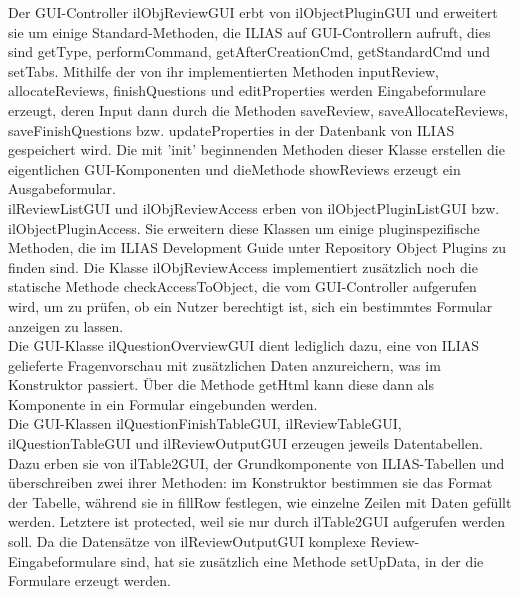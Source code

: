 \documentclass[a4paper]{scrreprt}
\begin{document}
Der GUI-Controller ilObjReviewGUI erbt von ilObjectPluginGUI und erweitert sie um einige Standard-Methoden, die ILIAS auf GUI-Controllern aufruft, dies sind getType, performCommand, getAfterCreationCmd, getStandardCmd und setTabs. Mithilfe der von ihr implementierten Methoden inputReview, allocateReviews, finishQuestions und editProperties werden Eingabeformulare erzeugt, deren Input dann durch die Methoden saveReview, saveAllocateReviews, saveFinishQuestions bzw. updateProperties in der Datenbank von ILIAS gespeichert wird. Die mit 'init' beginnenden Methoden dieser Klasse erstellen die eigentlichen GUI-Komponenten und dieMethode showReviews erzeugt ein Ausgabeformular.\\
ilReviewListGUI und ilObjReviewAccess erben von ilObjectPluginListGUI bzw. ilObjectPluginAccess. Sie erweitern diese Klassen um einige pluginspezifische Methoden, die im ILIAS Development Guide unter Repository Object Plugins
zu finden sind. Die Klasse ilObjReviewAccess implementiert zusätzlich noch die statische Methode checkAccessToObject, die vom GUI-Controller aufgerufen wird, um zu prüfen, ob ein Nutzer berechtigt ist, sich ein bestimmtes Formular anzeigen zu lassen.\\
Die GUI-Klasse ilQuestionOverviewGUI dient lediglich dazu, eine von ILIAS gelieferte Fragenvorschau mit zusätzlichen Daten anzureichern, was im Konstruktor passiert. Über die Methode getHtml kann diese dann als Komponente in ein Formular eingebunden werden.\\
Die GUI-Klassen ilQuestionFinishTableGUI, ilReviewTableGUI, ilQuestionTableGUI und ilReviewOutputGUI erzeugen jeweils Datentabellen. Dazu erben sie von ilTable2GUI, der Grundkomponente von ILIAS-Tabellen und überschreiben zwei ihrer Methoden: im Konstruktor bestimmen sie das Format der Tabelle, während sie in fillRow festlegen, wie einzelne Zeilen mit Daten gefüllt werden. Letztere ist protected, weil sie nur durch ilTable2GUI aufgerufen werden soll. Da die Datensätze von ilReviewOutputGUI komplexe Review-Eingabeformulare sind, hat sie zusätzlich eine Methode setUpData, in der die Formulare erzeugt werden.\\
\end{document}
